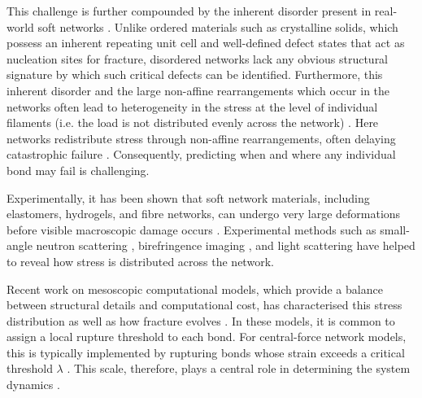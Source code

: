 \documentclass[asymmetricmargins]{library/duthesis}%
\begin{document}
This challenge is further compounded by the inherent disorder present in real-world soft networks \cite{broedersz_modeling_2014,broedersz_criticality_2011,feng_nonlinear_2016}. Unlike ordered materials such as crystalline solids, which possess an inherent repeating unit cell and well-defined defect states that act as nucleation sites for fracture, disordered networks lack any obvious structural signature by which such critical defects can be identified. Furthermore, this inherent disorder and the large non-affine rearrangements which occur in the networks often lead to heterogeneity in the stress at the level of individual filaments (i.e. the load is not distributed evenly across the network) \cite{Liang2016,tauber_microscopic_2020,tauber_sharing_2021,broedersz_modeling_2014,storm_nonlinear_2005,bouzidNetworkTopologySoft2018}. Here networks redistribute stress through non-affine rearrangements, often delaying catastrophic failure \cite{shivers_scaling_2019,tauber_sharing_2021,ducrot_structure_2015, tominaga_molecular_2007}. Consequently, predicting when and where any individual bond may fail is challenging.

Experimentally, it has been shown that soft network materials, including elastomers, hydrogels, and fibre networks, can undergo very large deformations before visible macroscopic damage occurs \cite{gong_why_2010,Kim2021,ducrot_toughening_2014,Creton50th2017,aimeMicroscopicDynamicsFailure2018,storm_nonlinear_2005}. Experimental methods such as small-angle neutron scattering \cite{ducrot_structure_2015,tominaga_molecular_2007}, birefringence imaging \cite{gong_double-network_2003,zheng_how_2021}, and light scattering \cite{porr_probing_2025} have helped to reveal how stress is distributed across the network. 

Recent work on mesoscopic computational models, which provide a balance between structural details and computational cost, has characterised this stress distribution \cite{shivers_normal_2019,shivers_scaling_2019,LernerCoordination2024,storm_nonlinear_2005} as well as how fracture evolves \cite{tauber_microscopic_2020,tauber_sharing_2021,tauber_role_2020,dussi_athermal_2020}. In these models, it is common to assign a local rupture threshold to each bond. For central-force network models, this is typically implemented by rupturing bonds whose strain exceeds a critical threshold $\lambda$ \cite{tauber_role_2020,dussi_athermal_2020}. This scale, therefore, plays a central role in determining the system dynamics \cite{tauber_microscopic_2020}.
\end{document}
